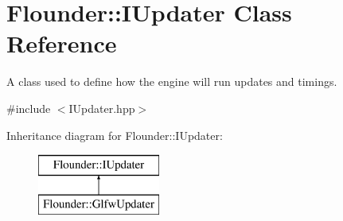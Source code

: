 \hypertarget{class_flounder_1_1_i_updater}{}\section{Flounder\+:\+:I\+Updater Class Reference}
\label{class_flounder_1_1_i_updater}


A class used to define how the engine will run updates and timings.  




{\ttfamily \#include $<$I\+Updater.\+hpp$>$}

Inheritance diagram for Flounder\+:\+:I\+Updater\+:\begin{figure}[H]
\begin{center}
\leavevmode
\includegraphics[height=2.000000cm]{class_flounder_1_1_i_updater}
\end{center}
\end{figure}
